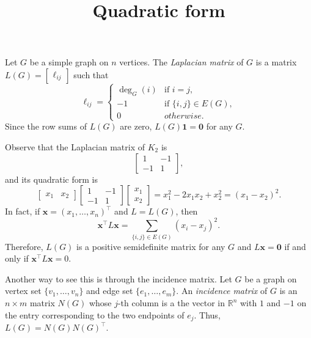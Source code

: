\documentclass{article}
\title{Quadratic form}
\date{\vspace{-1cm}}
\newcommand{\trans}{^\top}
\newcommand{\bzero}{\mathbf{0}}
\newcommand{\bone}{\mathbf{1}}
\newcommand{\bx}{\mathbf{x}}
\theoremstyle{definition}
\begin{document}
\maketitle
\large

Let $G$ be a simple graph on $n$ vertices.  The \emph{Laplacian matrix} of $G$ is a matrix $L(G) = \begin{bmatrix} \ell_{ij} \end{bmatrix}$ such that 
\[\ell_{ij} = \begin{cases}
\deg_G(i) & \text{if }i = j, \\
-1 & \text{if }\{i,j\}\in E(G), \\
0 & otherwise.
\end{cases}\]
Since the row sums of $L(G)$ are zero, $L(G)\bone = \bzero$ for any $G$.  

Observe that the Laplacian matrix of $K_2$ is 
\[\begin{bmatrix} 
 1 & -1 \\
 -1 & 1 
\end{bmatrix},\]
and its quadratic form is 
\[\begin{bmatrix} x_1 & x_2 \end{bmatrix} 
\begin{bmatrix} 
 1 & -1 \\
 -1 & 1 
\end{bmatrix}
\begin{bmatrix} x_1 \\ x_2 \end{bmatrix} = x_1^2 - 2x_1x_2 + x_2^2 = (x_1 - x_2)^2.\]
In fact, if $\bx = (x_1,\ldots,x_n)\trans$ and $L = L(G)$, then 
\[\bx\trans L\bx = \sum_{\{i,j\}\in E(G)}(x_i - x_j)^2.\]
Therefore, $L(G)$ is a positive semidefinite matrix for any $G$ and $L\bx = \bzero$ if and only if $\bx\trans L\bx = 0$.

Another way to see this is through the incidence matrix.  Let $G$ be a graph on vertex set $\{v_1,\ldots,v_n\}$ and edge set $\{e_1,\ldots,e_m\}$.  An \emph{incidence matrix} of $G$ is an $n\times m$ matrix $N(G)$ whose $j$-th column is a the vector in $\mathbb{R}^n$ with $1$ and $-1$ on the entry corresponding to the two endpoints of $e_j$.  Thus, $L(G) = N(G)N(G)\trans$.
\end{document}
